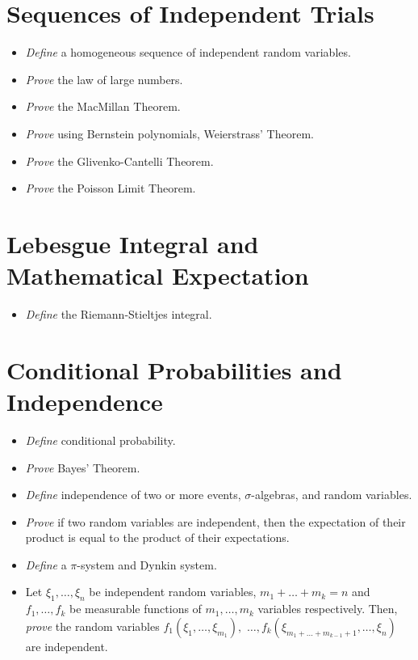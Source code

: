 \documentclass{article}
\newcommand{\cold}{{\color{babyblue}{\Snowflake}}}
\newcommand{\elegant}{{\color{brickred}{\ding{46}}}}
\newcommand{\prac}{{\color{arsenic}{\ding{43}}}}
\newcommand{\know}{{\color{arylideyellow}{\Lightning}}}
\begin{document}
\section{Sequences of Independent Trials}
\begin{itemize}[nosep]
    \item[\cold] \textit{Define} a homogeneous sequence of independent random variables. 
    \item[\cold] \textit{Prove} the law of large numbers.
    \item[\know] \textit{Prove} the MacMillan Theorem.
    \item[\elegant] \textit{Prove} using Bernstein polynomials, Weierstrass' Theorem.
    \item[\prac] \textit{Prove} the Glivenko-Cantelli Theorem.
    \item[\elegant] \textit{Prove} the Poisson Limit Theorem.
\end{itemize}
\section{Lebesgue Integral and Mathematical Expectation}
\begin{itemize}[nosep]
    \item[\cold] \textit{Define} the Riemann-Stieltjes integral.
\end{itemize}

\section{Conditional Probabilities and Independence}
\begin{itemize}[nosep]
    \item[\cold] \textit{Define} conditional probability.
    \item[\cold] \textit{Prove} Bayes' Theorem.
    \item[\cold] \textit{Define} independence of two or more events, $\sigma$-algebras, and random variables. 
    \item[\prac] \textit{Prove} if two random variables are independent, then the expectation of their product is equal to the product of their expectations. 
    \item[\cold] \textit{Define} a $\pi$-system and Dynkin system.
    \item[\prac] Let $\xi_1,\ldots,\xi_n$ be independent random variables, $m_1+\ldots+m_k= n$ and $f_1,\ldots,f_k$ be measurable functions of $m_1,\ldots,m_k$ variables respectively. Then, \textit{prove} the random variables $f_1(\xi_1,\ldots,\xi_{m_1}),$ $\ldots, f_k(\xi_{m_1+\ldots+m_{k-1}+1},\ldots,\xi_n)$ are independent. 
\end{itemize}
\end{document}
